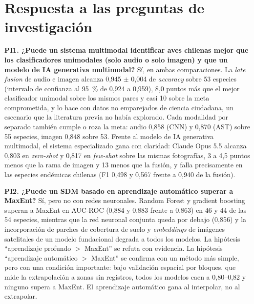 
\section{Respuesta a las preguntas de investigación}\label{sec:respuestas}

\textbf{PI1. ¿Puede un sistema multimodal identificar aves chilenas mejor
que los clasificadores unimodales (solo audio o solo imagen) y que un modelo de IA generativa multimodal?} Sí, en ambas comparaciones. La \textit{late fusion} de audio e imagen alcanza 0,945 $\pm$ 0,004 de
\textit{accuracy} sobre 53 especies (intervalo de confianza al
\SI{95}{\percent} de 0,924 a 0,959), 8,0 puntos más que el mejor
clasificador unimodal sobre los mismos pares y casi 10 sobre la
meta comprometida, y lo hace con datos no emparejados de ciencia ciudadana,
un escenario que la literatura previa no había explorado. Cada modalidad
por separado también cumple o roza la meta: audio 0,858 (CNN) y 0,870 (AST)
sobre 55 especies, imagen 0,848 sobre 53. Frente al modelo de IA generativa multimodal, el sistema especializado gana con claridad: Claude Opus 5.5 alcanza 0,803 en \textit{zero-shot} y 0,817 en
\textit{few-shot} sobre las mismas fotografías, 3 a 4,5 puntos menos que la
rama de imagen y 13 menos que la fusión, y falla precisamente en las
especies endémicas chilenas (F1 0,498 y 0,567 frente a 0,940 de la
fusión).

\textbf{PI2. ¿Puede un SDM basado en aprendizaje automático superar a
MaxEnt?} Sí, pero no con redes neuronales. Random Forest y gradient
boosting superan a MaxEnt en AUC-ROC (0,884 y 0,883 frente a 0,863) en 46 y 44
de las 54 especies, mientras que la red neuronal conjunta queda por debajo
(0,856) y la incorporación de parches de cobertura de suelo y
\textit{embeddings} de imágenes satelitales de un modelo fundacional degrada
a todos los modelos. La hipótesis ``aprendizaje
profundo $>$ MaxEnt'' se refuta con evidencia. La hipótesis ``aprendizaje
automático $>$ MaxEnt'' se confirma con un método más simple, pero con una
condición importante: bajo validación espacial por bloques, que mide la
extrapolación a zonas sin registros, todos los modelos caen a 0,80--0,82 y
ninguno supera a MaxEnt. El aprendizaje automático gana al interpolar, no al
extrapolar.

